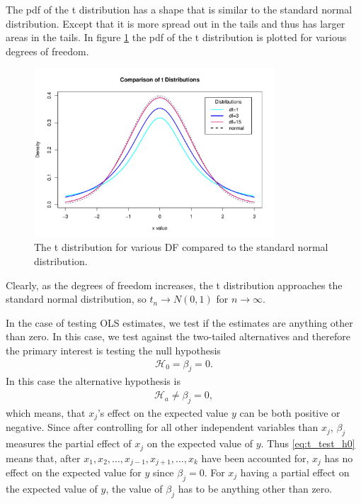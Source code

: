 The pdf of the t distribution has a shape that is similar to the standard normal distribution. Except that it is more spread out in the tails and thus has larger areas in the tails. In figure \ref{fig:t_distribution} the pdf of the t distribution is plotted for various degrees of freedom. 

\begin{figure}[h]
    \centering
    \includegraphics[width = 0.8\textwidth]{figures/t_distribution.pdf}
    \caption{The t distribution for various DF compared to the standard normal distribution.}
    \label{fig:t_distribution}
\end{figure}

Clearly, as the degrees of freedom increases, the t distribution approaches the standard normal distribution, so $t_n \rightarrow N(0,1)$ for $n\rightarrow \infty$. 

In the case of testing OLS estimates, we test if the estimates are anything other than zero. In this case, we test against the two-tailed alternatives and therefore the primary interest is testing the null hypothesis
\begin{align} \label{eq:t_test_h0}
    \mathcal{H}_0=\beta_j=0.
\end{align}
In this case the alternative hypothesis is
\begin{align} \label{eq:t_test_ha}
    \mathcal{H}_a \neq\beta_j=0,
\end{align}
which means, that $x_j$'s effect on the expected value $y$ can be both positive or negative.
Since after controlling for all other independent variables than $x_j$, $\beta_j$ measures the partial effect of $x_j$ on the expected value of $y$. 
Thus \eqref{eq:t_test_h0} means that, after $x_1,x_2, \ldots, x_{j-1}, x_{j+1}, \ldots, x_k$ have been accounted for, $x_j$ has no effect on the expected value for $y$ since $\beta_j=0$. 
For $x_j$ having a partial effect on the expected value of $y$, the value of $\beta_j$ has to be anything other than zero.

